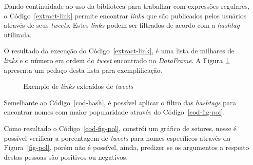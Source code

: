 Dando continuidade ao uso da biblioteca para trabalhar com expressões regulares, o Código~\ref{extract-link} permite encontrar \textit{links} que são publicados pelos usuários através de seus \textit{tweets}. Estes \textit{links} podem ser filtrados de acordo com a \textit{hashtag} utilizada.



O resultado da execução do Código~\ref{extract-link}, é uma lista de milhares de \textit{links} e o número em ordem do \textit{tweet} encontrado no \textit{DataFrame}. A Figura~\ref{links} apresenta um pedaço desta lista para exemplificação.

\begin{figure}[h]
	\centering
	\caption{Exemplo de \textit{links} extraídos de \textit{tweets}}
	\vspace{-0.3cm}
	\label{links}
\end{figure}

Semelhante ao Código~\ref{cod-hash}, é possível aplicar o filtro das \textit{hashtags} para encontrar nomes com maior popularidade através do Código~\ref{cod-fig-pol}.



Como resultado o Código~\ref{cod-fig-pol}, constrói um gráfico de setores, nesse é possível verificar a porcentagem de \textit{tweets} para nomes específicos através da Figura~\ref{fig-pol}, porém não é possível, ainda, predizer se os argumentos a respeito destas pessoas são positivos ou negativos. \\ \\ \\ \\


